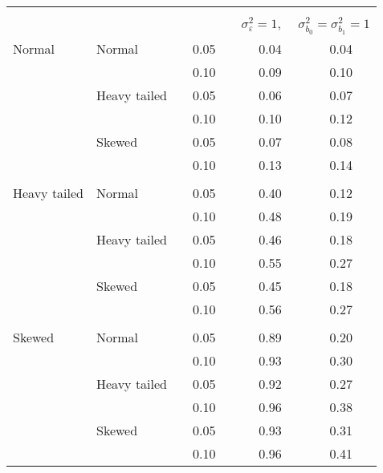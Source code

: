 \begin{table}[ht]
\begin{scriptsize}
\begin{tabular}{ll p{.1cm} c p{.1cm} cc}
&&&&&&\\             
  & && && \multicolumn{2}{c}{$\sigma_{\varepsilon}^2 = 1$, \ \ $\sigma_{b_0}^2 = \sigma_{b_1}^2 = 1$} \\ \cline{6-7}
\rowcolor{gray!20}Normal       & Normal       && 0.05 &&  0.04 & 0.04 \\ 
\rowcolor{gray!20}             &              && 0.10 &&  0.09 & 0.10 \\ 
\rowcolor{gray!20}             & Heavy tailed && 0.05 &&  0.06 & 0.07 \\ 
\rowcolor{gray!20}             &              && 0.10 &&  0.10 & 0.12 \\ 
\rowcolor{gray!20}             & Skewed       && 0.05 &&  0.07 & 0.08 \\ 
\rowcolor{gray!20}             &              && 0.10 &&  0.13 & 0.14 \\ 
             &&&&&&\\
Heavy tailed & Normal       && 0.05 &&  0.40 & 0.12 \\ 
             &              && 0.10 &&  0.48 & 0.19 \\ 
             & Heavy tailed && 0.05 &&  0.46 & 0.18 \\ 
             &              && 0.10 &&  0.55 & 0.27 \\ 
             & Skewed       && 0.05 &&  0.45 & 0.18 \\ 
             &              && 0.10 &&  0.56 & 0.27 \\ 
             &&&&&&\\
Skewed       & Normal       && 0.05 &&  0.89 & 0.20 \\ 
             &              && 0.10 &&  0.93 & 0.30 \\ 
             & Heavy tailed && 0.05 &&  0.92 & 0.27 \\ 
             &              && 0.10 &&  0.96 & 0.38 \\ 
             & Skewed       && 0.05 &&  0.93 & 0.31 \\ 
             &              && 0.10 &&  0.96 & 0.41 \\ 


\end{tabular}
\end{scriptsize}
\end{table}
